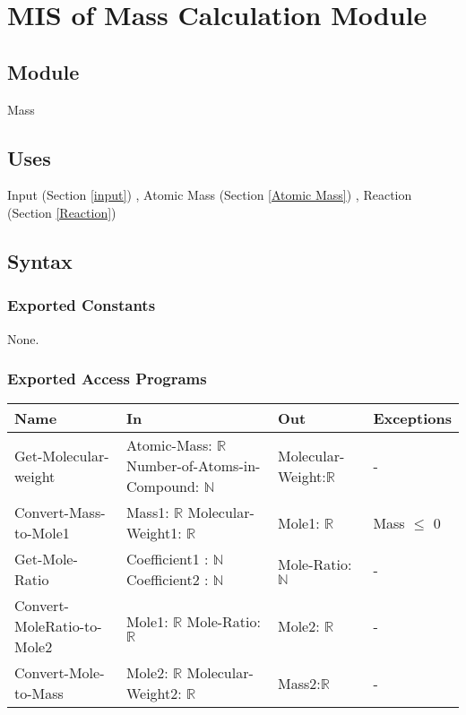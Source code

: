 \documentclass[12pt, titlepage]{article}
\begin{document}
\newpage
  
\section{MIS of Mass Calculation Module} \label{Mass} 

\subsection{Module}

Mass

\subsection{Uses}

Input (Section \ref{input}) , Atomic Mass (Section \ref{Atomic Mass}) , Reaction (Section \ref{Reaction}) 

\subsection{Syntax}

\subsubsection{Exported Constants}

None.

\subsubsection{Exported Access Programs}

\begin{center}
\begin{tabular}{p{2cm} p{4cm} p{4cm} p{2cm}}
\hline
\textbf{Name} & \textbf{In} & \textbf{Out} & \textbf{Exceptions} \\
\hline
{Get-Molecular-weight} & Atomic-Mass: $\mathbb{R}$
  \newline Number-of-Atoms-in-Compound: $\mathbb{N}$ & Molecular-Weight:$\mathbb{R}$ & - \\
\hline
{Convert-Mass-to-Mole1}  & Mass1: $\mathbb{R}$
  \newline Molecular-Weight1: $\mathbb{R}$ & Mole1: $\mathbb{R}$  & Mass $\leq$ 0\\
\hline
{Get-Mole-Ratio}  & Coefficient1 : $\mathbb{N}$
  \newline Coefficient2 : $\mathbb{N}$ & Mole-Ratio: $\mathbb{N}$  & - \\
  \hline
{Convert-MoleRatio-to-Mole2} & Mole1: $\mathbb{R}$
  \newline Mole-Ratio: $\mathbb{R}$ & Mole2: $\mathbb{R}$ & - \\
 \hline
 {Convert-Mole-to-Mass} & Mole2: $\mathbb{R}$
  \newline Molecular-Weight2: $\mathbb{R}$ & Mass2:$\mathbb{R}$ & - \\
\hline
\end{tabular}
\end{center}
\end{document}

